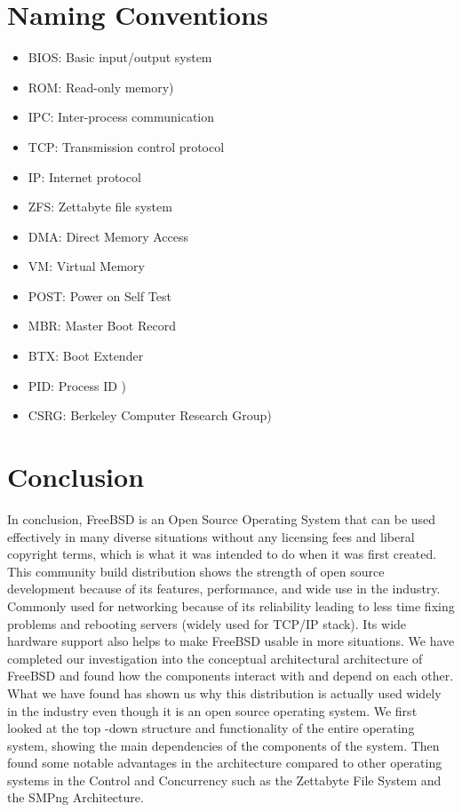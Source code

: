 \documentclass[12pt, dvipsnames, a4paper]{article}
\begin{document}
\section{Naming Conventions}
\begin{itemize}
	\item{BIOS: Basic input/output system }
	\item{ROM: Read-only memory)}
           \item{IPC: Inter-process communication}
           \item{TCP: Transmission control protocol}
           \item{IP: Internet protocol}
	\item{ZFS: Zettabyte file system}
	\item{DMA: Direct Memory Access}
           \item{VM: Virtual Memory}
           \item{POST: Power on Self Test}
           \item{MBR: Master Boot Record}
   	 \item{BTX: Boot Extender}
	\item{PID: Process ID )}
	\item{CSRG: Berkeley Computer Research Group)}
\end{itemize}

\section{Conclusion}
In conclusion, FreeBSD is an Open Source Operating System that can be used effectively in many diverse situations without any licensing fees and liberal copyright terms, which is what it was intended to do when it was first created. This community build distribution shows the strength of open source development because of its features, performance, and wide use in the industry. Commonly used for networking because of its reliability leading to less time fixing problems and rebooting servers (widely used for TCP/IP stack). Its wide hardware support also helps to make FreeBSD usable in more situations. We have completed our investigation into the conceptual architectural architecture of FreeBSD and found how the components interact with and depend on each other. What we have found has shown us why this distribution is actually used widely in the industry even though it is an open source operating system. We first looked at the top -down structure and functionality of the entire operating system, showing the main dependencies of the components of the system. Then found some notable advantages in the architecture compared to other operating systems in the Control and Concurrency such as the Zettabyte File System and the SMPng Architecture. 
\end{document}
